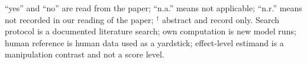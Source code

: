 \par\smallskip\noindent\parbox{\linewidth}{\scriptsize
``yes'' and ``no'' are read from the paper; ``n.a.'' means not applicable; ``n.r.'' means not recorded in our reading of the paper;
$^{\dagger}$ abstract and record only. Search protocol is a documented literature search; own computation is new model runs; human
reference is human data used as a yardstick; effect-level estimand is a manipulation contrast and not a score level.}
\endgroup

